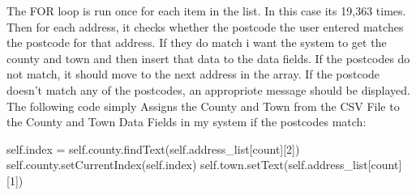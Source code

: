 The FOR loop is run once for each item in the list. In this case its 19,363 times. Then for each address, it checks whether the postcode the user entered matches the postcode for that address. If they do match i want the system to get the county and town and then insert that data to the data fields. If the postcodes do not match, it should move to the next address in the array. If the postcode doesn't match any of the postcodes, an appropriote message should be displayed. The following code simply Assigns the County and Town from the CSV File to the County and Town Data Fields in my system if the postcodes match:

\begin{python}
self.index = self.county.findText(self.address_list[count][2])
                                        self.county.setCurrentIndex(self.index)
                                        self.town.setText(self.address_list[count][1])
\end{python}

